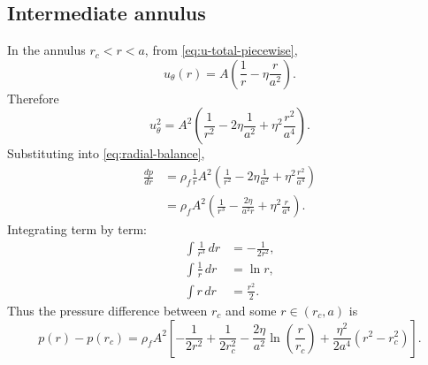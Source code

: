 \documentclass[11pt]{article}
\newcommand{\rhoF}{\rho_{\!f}}
\newcommand{\rc}{r_c}
\begin{document}
        \subsection{Intermediate annulus}
            
            In the annulus \(\rc<r<a\), from \eqref{eq:u-total-piecewise},
            \[
                u_\theta(r)=A\left(\frac{1}{r}-\eta \frac{r}{a^2}\right).
            \]
            Therefore
            \begin{equation}
                u_\theta^2
                =
                A^2\left(
                       \frac{1}{r^2}
                       -
                       2\eta \frac{1}{a^2}
                       +
                       \eta^2 \frac{r^2}{a^4}
                \right).
                \label{eq:u2-annulus}
            \end{equation}
            Substituting into \eqref{eq:radial-balance},
            \begin{align}
                \frac{dp}{dr}
                &=
                \rhoF \frac{1}{r}A^2\left(
                                        \frac{1}{r^2}
                                        -
                                        2\eta \frac{1}{a^2}
                                        +
                                        \eta^2 \frac{r^2}{a^4}
                \right)
                \\
                &=
                \rhoF A^2\left(
                             \frac{1}{r^3}
                             -
                             \frac{2\eta}{a^2 r}
                             +
                             \eta^2 \frac{r}{a^4}
                \right).
                \label{eq:dpdr-annulus}
            \end{align}
            Integrating term by term:
            \begin{align}
                \int \frac{1}{r^3}\,dr &= -\frac{1}{2r^2},
                \\
                \int \frac{1}{r}\,dr &= \ln r,
                \\
                \int r\,dr &= \frac{r^2}{2}.
            \end{align}
            Thus the pressure difference between \(\rc\) and some \(r\in(\rc,a)\) is
            \begin{equation}
                p(r)-p(\rc)
                =
                \rhoF A^2
                \left[
                    -\frac{1}{2r^2}+\frac{1}{2\rc^2}
                    -\frac{2\eta}{a^2}\ln\!\left(\frac{r}{\rc}\right)
                    +\frac{\eta^2}{2a^4}(r^2-\rc^2)
                \right].
                \label{eq:p-annulus}
            \end{equation}
        
\end{document}

